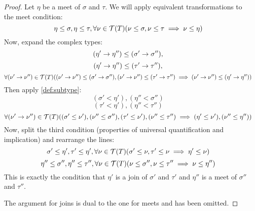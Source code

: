\documentclass[main.tex]{subfiles}
\begin{document}
\begin{proof}
    Let $\eta$ be a meet of $\sigma$ and $\tau$. We will apply equivalent
    transformations to the meet condition:
    \[
        \eta \leq \sigma, \eta \leq \tau,
            \forall \nu \in \mathcal{T}( T ) (\nu \leq \sigma, \nu \leq \tau \implies \nu \leq \eta)
    \]
    Now, expand the complex types:
    \[    (\eta' \rightarrow \eta'') \leq (\sigma' \rightarrow \sigma''),
    \]
    \[    (\eta' \rightarrow \eta'') \leq (\tau' \rightarrow \tau''),
    \]
    \[
            \forall (\nu' \rightarrow \nu'') \in \mathcal{T}( T ) ((\nu' \rightarrow \nu'') \leq (\sigma' \rightarrow \sigma''), (\nu' \rightarrow \nu'') \leq (\tau' \rightarrow \tau'') \implies (\nu' \rightarrow \nu'') \leq (\eta' \rightarrow \eta''))
    \]
    Then apply \cref{def:subtype}:
    \[    (\sigma' \less \eta') , (\eta'' \less \sigma'')
    \]
    \[    (\tau' \less \eta') , (\eta'' \less \tau'')
    \]
    \[
            \forall (\nu' \rightarrow \nu'') \in \mathcal{T}( T ) 
            ((\sigma' \leq \nu'), (\nu'' \leq \sigma''), 
             (\tau' \leq \nu'), (\nu'' \leq \tau'')
             \implies (\eta' \leq \nu'), (\nu'' \leq \eta''))
    \]
    Now, split the third condition (properties of universal quantification and implication)
    and rearrange the lines:
    \[
        \sigma' \leq \eta', \tau' \leq \eta',
            \forall \nu \in \mathcal{T}( T ) (\sigma' \leq \nu, \tau' \leq \nu \implies \eta' \leq \nu)
    \]
    \[
        \eta'' \leq \sigma'', \eta'' \leq \tau'',
            \forall \nu \in \mathcal{T}( T ) (\nu \leq \sigma'', \nu \leq \tau'' \implies \nu \leq \eta'')
    \]
    This is exactly the condition that $\eta'$ is a join of $\sigma'$ 
    and $\tau'$ and
    $\eta''$ is a meet of $\sigma''$ and $\tau''$.
    
    The argument for joins is dual to the one for meets and has been omitted.
\end{proof}
\end{document}
